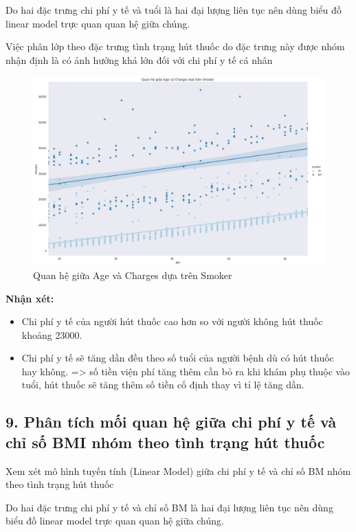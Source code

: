 \documentclass{article}
\begin{document}
	Do hai đặc trưng chi phí y tế và tuổi là hai đại lượng liên tục nên dùng biểu đồ linear model trực quan quan hệ giữa chúng.
	
	Việc phân lớp theo đặc trưng tình trạng hút thuốc do đặc trưng này được nhóm nhận định là có ảnh hưởng khá lớn đối với chi phí y tế cá nhân
	\begin{figure}[H]
		\centering
		\includegraphics[width=1\textwidth]{images/age_charges_by_smoker.png}
		\caption{Quan hệ giữa Age và Charges dựa trên Smoker}
		\label{fig:writing-thesis-linear-model-medical-charges-age-group-smoker}
	\end{figure}
	\textbf{Nhận xét:} 
	\begin{itemize}
		\item Chi phí y tế của người hút thuốc cao hơn so với người không hút thuốc khoảng 23000.
		\item Chi phí y tế sẽ tăng dần đều theo số tuổi của người bệnh dù có hút thuốc hay không. => số tiền viện phí tăng thêm cần bỏ ra khi khám phụ thuộc vào tuổi, hút thuốc sẽ tăng thêm số tiền cố định thay vì tỉ lệ tăng dần.
	\end{itemize}

	\subsection{9. Phân tích mối quan hệ giữa chi phí y tế và chỉ số BMI nhóm theo tình trạng hút thuốc}
	\qquad Xem xét mô hình tuyến tính (Linear Model) giữa  chi phí y tế và chỉ số BM nhóm theo tình trạng hút thuốc
	
	Do hai đặc trưng chi phí y tế và chỉ số BM là hai đại lượng liên tục nên dùng biểu đồ linear model trực quan quan hệ giữa chúng.
	
\end{document}
